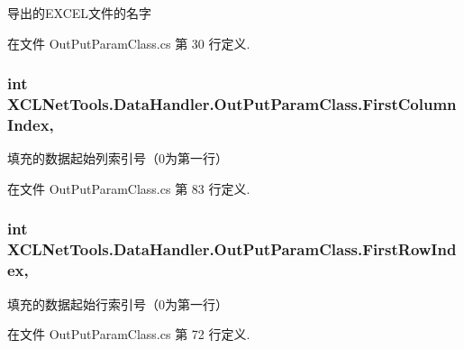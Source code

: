 导出的\-E\-X\-C\-E\-L文件的名字 



在文件 Out\-Put\-Param\-Class.\-cs 第 30 行定义.

\hypertarget{class_x_c_l_net_tools_1_1_data_handler_1_1_out_put_param_class_ad7f400014e22c2935b3acd107b700301}{
\subsubsection[{First\-Column\-Index}]{\setlength{\rightskip}{0pt plus 5cm}int X\-C\-L\-Net\-Tools.\-Data\-Handler.\-Out\-Put\-Param\-Class.\-First\-Column\-Index\hspace{0.3cm}{\ttfamily [get]}, {\ttfamily [set]}}}\label{class_x_c_l_net_tools_1_1_data_handler_1_1_out_put_param_class_ad7f400014e22c2935b3acd107b700301}


填充的数据起始列索引号（0为第一行） 



在文件 Out\-Put\-Param\-Class.\-cs 第 83 行定义.

\hypertarget{class_x_c_l_net_tools_1_1_data_handler_1_1_out_put_param_class_a2fce0d6591ecfcef5f4d469d5739e326}{
\subsubsection[{First\-Row\-Index}]{\setlength{\rightskip}{0pt plus 5cm}int X\-C\-L\-Net\-Tools.\-Data\-Handler.\-Out\-Put\-Param\-Class.\-First\-Row\-Index\hspace{0.3cm}{\ttfamily [get]}, {\ttfamily [set]}}}\label{class_x_c_l_net_tools_1_1_data_handler_1_1_out_put_param_class_a2fce0d6591ecfcef5f4d469d5739e326}


填充的数据起始行索引号（0为第一行） 



在文件 Out\-Put\-Param\-Class.\-cs 第 72 行定义.

